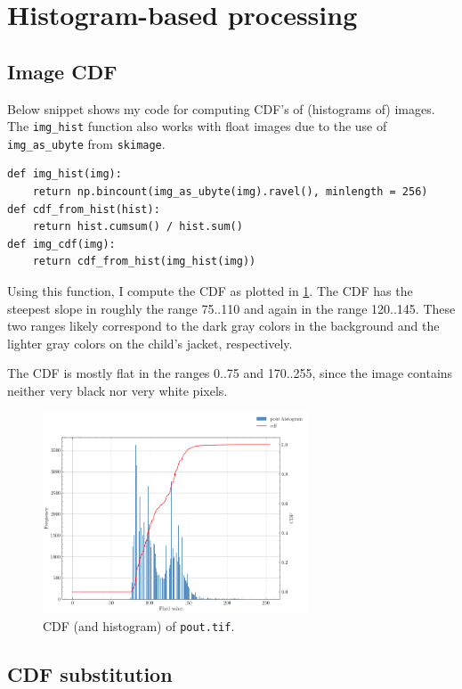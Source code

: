 \section{Histogram-based processing}

\subsection{Image CDF}

Below snippet shows my code for computing CDF's of (histograms of) images.
The \texttt{img\_hist} function also works with float images due to the use of
\texttt{img\_as\_ubyte} from \texttt{skimage}.

\begin{verbatim}
def img_hist(img):
    return np.bincount(img_as_ubyte(img).ravel(), minlength = 256)
def cdf_from_hist(hist):
    return hist.cumsum() / hist.sum()
def img_cdf(img):
    return cdf_from_hist(img_hist(img))
\end{verbatim}

Using this function, I compute the CDF as plotted in \cref{fig:3.1}. The CDF
has the steepest slope in roughly the range 75..110 and again in the range
120..145. These two ranges likely correspond to the dark gray colors in the
background and the lighter gray colors on the child's jacket, respectively.

The CDF is mostly flat in the ranges 0..75 and 170..255, since the image
contains neither very black nor very white pixels.

\begin{figure}[H]
    \centering
    \includegraphics[width=0.7\textwidth]{figures/task_3_1.png}
    \caption{CDF (and histogram) of \texttt{pout.tif}.}
    \label{fig:3.1}
\end{figure}

\subsection{CDF substitution}

